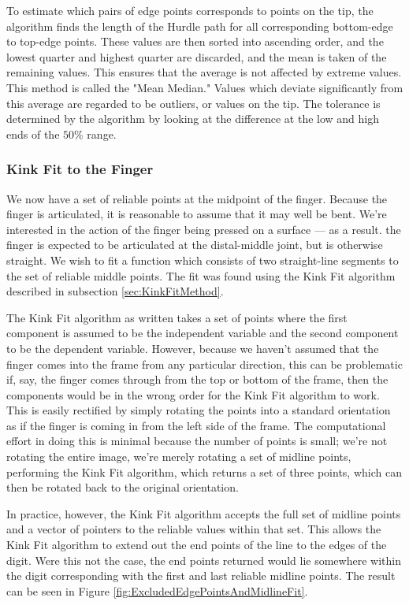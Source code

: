 To estimate which pairs of edge points corresponds to points on the tip, the algorithm finds the length of the Hurdle path for all corresponding bottom-edge to top-edge points. These values are then sorted into ascending order, and the lowest quarter and highest quarter are discarded, and the mean is taken of the remaining values. This ensures that the average is not affected by extreme values. This method is called the "Mean Median." Values which deviate significantly from this average are regarded to be outliers, or values on the tip. The tolerance is determined by the algorithm by looking at the difference at the low and high ends of the $50\%$ range.

\subsubsection{Kink Fit to the Finger}\label{sec:KinkFitToTheFinger}
We now have a set of reliable points at the midpoint of the finger. Because the finger is articulated, it is reasonable to assume that it may well be bent. We're interested in the action of the finger being pressed on a surface --- as a result. the finger is expected to be articulated at the distal-middle joint, but is otherwise straight. We wish to fit a function which consists of two straight-line segments to the set of reliable middle points. The fit was found using the Kink Fit algorithm described in subsection \ref{sec:KinkFitMethod}.

The Kink Fit algorithm as written takes a set of points where the first component is assumed to be the independent variable and the second component to be the dependent variable. However, because we haven't assumed that the finger comes into the frame from any particular direction, this can be problematic if, say, the finger comes through from the top or bottom of the frame, then the components would be in the wrong order for the Kink Fit algorithm to work. This is easily rectified by simply rotating the points into a standard orientation as if the finger is coming in from the left side of the frame. The computational effort in doing this is minimal because the number of points is small; we're not rotating the entire image, we're merely rotating a set of midline points, performing the Kink Fit algorithm, which returns a set of three points, which can then be rotated back to the original orientation.

In practice, however, the Kink Fit algorithm accepts the full set of midline points and a vector of pointers to the reliable values within that set. This allows the Kink Fit algorithm to extend out the end points of the line to the edges of the digit. Were this not the case, the end points returned would lie somewhere within the digit corresponding with the first and last reliable midline points. The result can be seen in Figure \ref{fig:ExcludedEdgePointsAndMidlineFit}.

